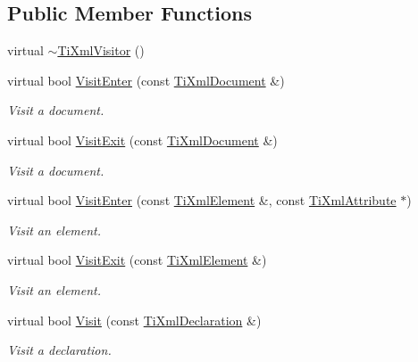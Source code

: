 \subsection*{Public Member Functions}
\begin{DoxyCompactItemize}
\item 
virtual \hyperlink{class_ti_xml_visitor_a276c739ec4701f27c3f86b8ead095e5a}{$\sim$TiXmlVisitor} ()
\item 
virtual bool \hyperlink{class_ti_xml_visitor_a07baecb52dd7d8716ae2a48ad0956ee0}{VisitEnter} (const \hyperlink{class_ti_xml_document}{TiXmlDocument} \&)
\begin{DoxyCompactList}\small\item\em Visit a document. \item\end{DoxyCompactList}\item 
virtual bool \hyperlink{class_ti_xml_visitor_aa0ade4f27087447e93974e975c3246ad}{VisitExit} (const \hyperlink{class_ti_xml_document}{TiXmlDocument} \&)
\begin{DoxyCompactList}\small\item\em Visit a document. \item\end{DoxyCompactList}\item 
virtual bool \hyperlink{class_ti_xml_visitor_af6c6178ffa517bbdba95d70490875fff}{VisitEnter} (const \hyperlink{class_ti_xml_element}{TiXmlElement} \&, const \hyperlink{class_ti_xml_attribute}{TiXmlAttribute} $\ast$)
\begin{DoxyCompactList}\small\item\em Visit an element. \item\end{DoxyCompactList}\item 
virtual bool \hyperlink{class_ti_xml_visitor_aec2b1f8116226d52f3a1b95dafd3a32c}{VisitExit} (const \hyperlink{class_ti_xml_element}{TiXmlElement} \&)
\begin{DoxyCompactList}\small\item\em Visit an element. \item\end{DoxyCompactList}\item 
virtual bool \hyperlink{class_ti_xml_visitor_afad71c71ce6473fb9b4b64cd92de4a19}{Visit} (const \hyperlink{class_ti_xml_declaration}{TiXmlDeclaration} \&)
\begin{DoxyCompactList}\small\item\em Visit a declaration. \item\end{DoxyCompactList}\item 

\end{DoxyCompactItemize}
